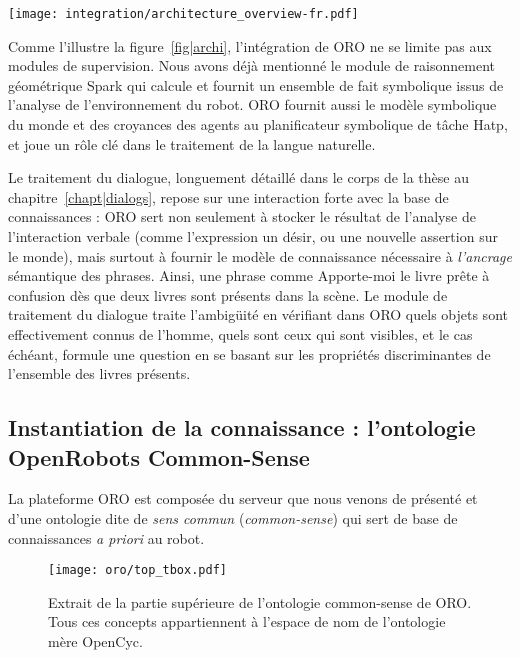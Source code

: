 \begin{figure*}[thpb]
  \centering
  \texttt{[image: integration/architecture\_overview-fr.pdf]}

  \caption {Schéma de l'architecture logicielle déployée sur les robots PR2 et
  Jido, deux robots de services interagissant avec des hommes au LAAS-CNRS. Le
  serveur ORO apparait en vert, au milieu.}

  \label{fig|archi}
\end{figure*}

Comme l'illustre la figure~\ref{fig|archi}, l'intégration de ORO ne se limite
pas aux modules de supervision. Nous avons déjà mentionné le module de
raisonnement géométrique {\sc Spark} qui calcule et fournit un ensemble de fait
symbolique issus de l'analyse de l'environnement du robot. ORO fournit aussi le
modèle symbolique du monde et des croyances des agents au planificateur
symbolique de tâche {\sc Hatp}, et joue un rôle clé dans le traitement de la
langue naturelle.

Le traitement du dialogue, longuement détaillé dans le corps de la thèse au
chapitre~\ref{chapt|dialogs}, repose sur une interaction forte avec la base de
connaissances : ORO sert non seulement à stocker le résultat de l'analyse de
l'interaction verbale (comme l'expression un désir, ou une nouvelle assertion
sur le monde), mais surtout à fournir le modèle de connaissance nécessaire à
\emph{l'ancrage} sémantique des phrases. Ainsi, une phrase comme \og
Apporte-moi le livre \fg prête à confusion dès que deux livres sont présents
dans la scène. Le module de traitement du dialogue traite l'ambigüité en
vérifiant dans ORO quels objets sont effectivement connus de l'homme, quels
sont ceux qui sont visibles, et le cas échéant, formule une question en se
basant sur les propriétés discriminantes de l'ensemble des livres présents.


\subsection*{Instantiation de la connaissance : l'ontologie OpenRobots Common-Sense}
\label{sect|oro-commonsense}

La plateforme ORO est composée du serveur que nous venons de présenté et d'une
ontologie dite de \emph{sens commun} (\emph{common-sense}) qui sert de base de
connaissances \textit{a priori} au robot.

\begin{figure}
    \centering
    \texttt{[image: oro/top\_tbox.pdf]}

    \caption{Extrait de la partie supérieure de l'ontologie common-sense de
    ORO. Tous ces concepts appartiennent à l'espace de nom de l'ontologie
    mère {\sc OpenCyc}.}

    \label{fig|upper_tbox}
\end{figure}

